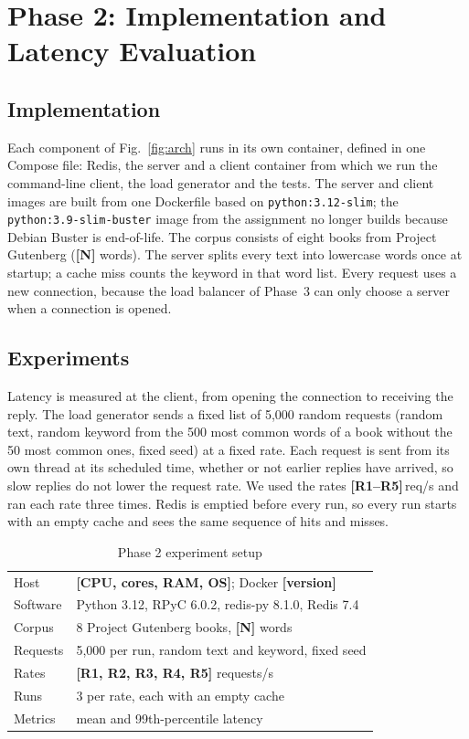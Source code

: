 \section{Phase 2: Implementation and Latency Evaluation}\label{sec:impl}

\subsection{Implementation}
Each component of Fig.~\ref{fig:arch} runs in its own container, defined in one
Compose file: Redis, the server and a client container from which we run the
command-line client, the load generator and the tests. The server and client
images are built from one Dockerfile based on \texttt{python:3.12-slim}; the
\texttt{python:3.9-slim-buster} image from the assignment no longer builds because
Debian Buster is end-of-life. The corpus consists of eight books from Project
Gutenberg (\textbf{[N]} words). The server splits every text into lowercase words
once at startup; a cache miss counts the keyword in that word list. Every request
uses a new connection, because the load balancer of Phase~3 can only choose a
server when a connection is opened.

\subsection{Experiments}
Latency is measured at the client, from opening the connection to receiving the
reply. The load generator sends a fixed list of 5{,}000 random requests (random
text, random keyword from the 500 most common words of a book without the 50 most
common ones, fixed seed) at a fixed rate. Each request is sent from its own thread
at its scheduled time, whether or not earlier replies have arrived, so slow replies
do not lower the request rate. We used the rates \textbf{[R1--R5]}\,req/s and ran
each rate three times. Redis is emptied before every run, so every run starts with
an empty cache and sees the same sequence of hits and misses.

\begin{table}[t]
\caption{Phase 2 experiment setup}
\label{tab:setup}
\centering
\footnotesize
\begin{tabular}{@{}p{}p{}@{}}
\hline
Host & \textbf{[CPU, cores, RAM, OS]}; Docker \textbf{[version]} \\
Software & Python 3.12, RPyC 6.0.2, redis-py 8.1.0, Redis 7.4 \\
Corpus & 8 Project Gutenberg books, \textbf{[N]} words \\
Requests & 5{,}000 per run, random text and keyword, fixed seed \\
Rates & \textbf{[R1, R2, R3, R4, R5]} requests/s \\
Runs & 3 per rate, each with an empty cache \\
Metrics & mean and 99th-percentile latency \\
\hline
\end{tabular}
\end{table}

